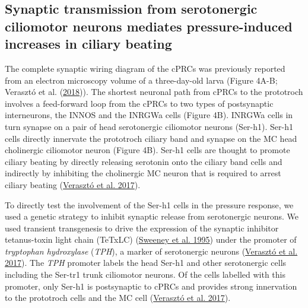 \documentclass[
]{article}
\begin{document}
\hypertarget{synaptic-transmission-from-serotonergic-ciliomotor-neurons-mediates-pressure-induced-increases-in-ciliary-beating}{%
\subsection{Synaptic transmission from serotonergic ciliomotor neurons
mediates pressure-induced increases in ciliary
beating}\label{synaptic-transmission-from-serotonergic-ciliomotor-neurons-mediates-pressure-induced-increases-in-ciliary-beating}}

The complete synaptic wiring diagram of the cPRCs was previously
reported from an electron microscopy volume of a three-day-old larva
(Figure 4A-B; Verasztó et al.
(\protect\hyperlink{ref-veraszto2018}{2018})). The shortest neuronal
path from cPRCs to the prototroch involves a feed-forward loop from the
cPRCs to two types of postsynaptic interneurons, the INNOS and the
INRGWa cells (Figure 4B). INRGWa cells in turn synapse on a pair of head
serotonergic ciliomotor neurons (Ser-h1). Ser-h1 cells directly
innervate the prototroch ciliary band and synapse on the MC head
cholinergic ciliomotor neuron (Figure 4B). Ser-h1 cells are thought to
promote ciliary beating by directly releasing serotonin onto the ciliary
band cells and indirectly by inhibiting the cholinergic MC neuron that
is required to arrest ciliary beating
(\protect\hyperlink{ref-veraszto2017a}{Verasztó et al. 2017}).

To directly test the involvement of the Ser-h1 cells in the pressure
response, we used a genetic strategy to inhibit synaptic release from
serotonergic neurons. We used transient transgenesis to drive the
expression of the synaptic inhibitor tetanus-toxin light chain (TeTxLC)
(\protect\hyperlink{ref-sweeney1995}{Sweeney et al. 1995}) under the
promoter of \emph{tryptophan hydroxylase} (\emph{TPH}), a marker of
serotonergic neurons (\protect\hyperlink{ref-veraszto2017a}{Verasztó et
al. 2017}). The \emph{TPH} promoter labels the head Ser-h1 and other
serotonergic cells including the Ser-tr1 trunk ciliomotor neurons. Of
the cells labelled with this promoter, only Ser-h1 is postsynaptic to
cPRCs and provides strong innervation to the prototroch cells and the MC
cell (\protect\hyperlink{ref-veraszto2017a}{Verasztó et al. 2017}).
\end{document}
